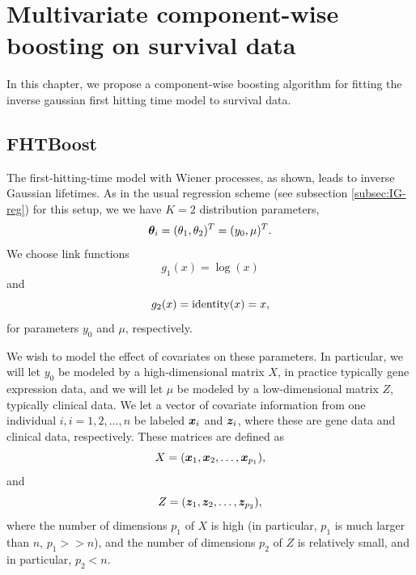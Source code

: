 \chapter{Multivariate component-wise boosting on survival data}
In this chapter, we propose a component-wise boosting algorithm for fitting the inverse gaussian first hitting time model to survival data.

\section{FHTBoost}
The first-hitting-time model with Wiener processes, as shown, leads to inverse Gaussian lifetimes. As in the usual
regression scheme (see subsection \ref{subsec:IG-reg}) for this setup, we we have $K=2$ distribution parameters,
\begin{equation}
    \boldsymbol{\theta}_i=(\theta_1,\theta_2)^T=(y_0,\mu)^T.
\end{equation}
We choose link functions
\begin{equation}
    g_1(x)=\log(x)
\end{equation}
and
\begin{equation}
    g_2(x)=\operatorname{identity}(x)=x,
\end{equation}
for parameters $y_0$ and $\mu$, respectively.

We wish to model the effect of covariates on these parameters. In particular, we will let $y_0$ be modeled by a high-dimensional matrix $X$,
in practice typically gene expression data, and we will let $\mu$ be modeled by a low-dimensional matrix $Z$, typically clinical data.
We let a vector of covariate information from one individual $i,i=1,2,\ldots,n$ be labeled $\bm{x}_i$ and $\bm{z}_i$, where these are
gene data and clinical data, respectively.
These matrices are defined as
\begin{equation}
    X=(\bm{x}_1,\bm{x}_2,\ldots,\bm{x}_{p_1}),
\end{equation}
and
\begin{equation}
    Z=(\bm{z}_1,\bm{z}_2,\ldots,\bm{z}_{p_2}),
\end{equation}
where the number of dimensions $p_1$ of $X$ is high (in particular, $p_1$ is much larger than $n$, $p_1 >> n$),
and the number of dimensions $p_2$ of $Z$ is relatively small, and in particular, $p_2 < n$.

